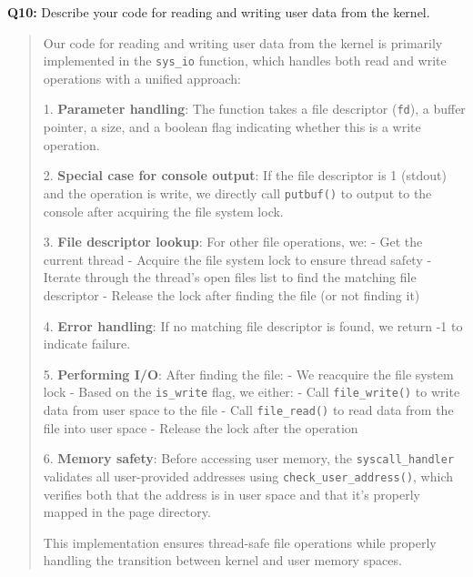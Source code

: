 \documentclass[a4paper,11pt]{paper}
\begin{document}
\textbf{Q10:} Describe your code for reading and writing user data from the kernel.
\begin{quote}
Our code for reading and writing user data from the kernel is primarily implemented in the \texttt{sys\_io} function, which handles both read and write operations with a unified approach:

1. \textbf{Parameter handling}: The function takes a file descriptor (\texttt{fd}), a buffer pointer, a size, and a boolean flag indicating whether this is a write operation.

2. \textbf{Special case for console output}: If the file descriptor is 1 (stdout) and the operation is write, we directly call \texttt{putbuf()} to output to the console after acquiring the file system lock.

3. \textbf{File descriptor lookup}: For other file operations, we:
   - Get the current thread
   - Acquire the file system lock to ensure thread safety
   - Iterate through the thread's open files list to find the matching file descriptor
   - Release the lock after finding the file (or not finding it)

4. \textbf{Error handling}: If no matching file descriptor is found, we return -1 to indicate failure.

5. \textbf{Performing I/O}: After finding the file:
   - We reacquire the file system lock
   - Based on the \texttt{is\_write} flag, we either:
     - Call \texttt{file\_write()} to write data from user space to the file
     - Call \texttt{file\_read()} to read data from the file into user space
   - Release the lock after the operation

6. \textbf{Memory safety}: Before accessing user memory, the \texttt{syscall\_handler} validates all user-provided addresses using \texttt{check\_user\_address()}, which verifies both that the address is in user space and that it's properly mapped in the page directory.

This implementation ensures thread-safe file operations while properly handling the transition between kernel and user memory spaces.
\end{quote}
\end{document}
